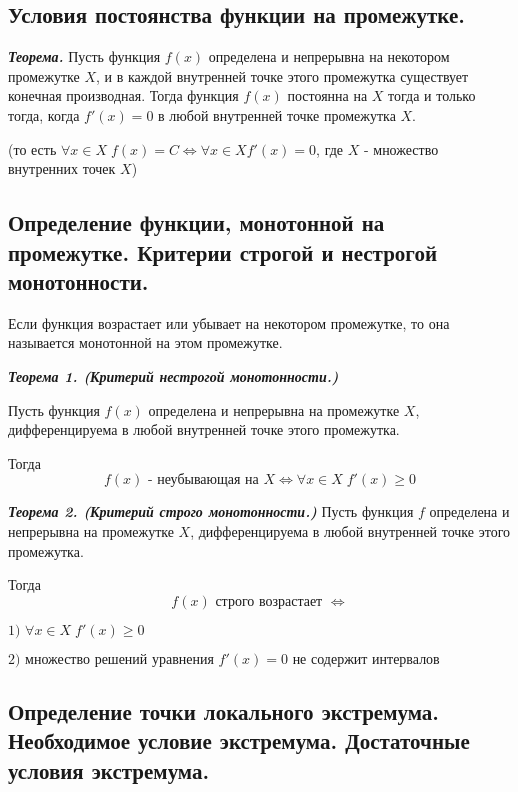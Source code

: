 \documentclass[a4paper,12pt]{article}
\theoremstyle{plain} %
\theoremstyle{definition} %
\theoremstyle{remark} %
\begin{document}
\newpage
{}
\subsection*{Условия постоянства функции на промежутке.                                                }

\textbf{\textit{Теорема.}} Пусть функция $f(x)$ определена и непрерывна на некотором промежутке $X$, и в каждой внутренней точке этого промежутка существует конечная производная. Тогда функция $f(x)$ постоянна на $X$ тогда и только тогда, когда $f'(x) = 0$ в любой внутренней точке промежутка $X$.

(то есть $\forall x \in X \; f(x) = C \Leftrightarrow \forall x \in X f'(x) = 0$, где $X$ - множество внутренних точек $X$)


\newpage
{}
\subsection*{Определение функции, монотонной на промежутке. Критерии строгой и нестрогой монотонности. }

Если функция возрастает или убывает на некотором промежутке, то она называется монотонной на этом промежутке.

\textit{\textbf{Теорема 1. (Критерий нестрогой монотонности.)}}

Пусть функция $f(x)$ определена и непрерывна на промежутке $X$, дифференцируема в любой внутренней точке этого промежутка.

Тогда
\[ f(x) \text{ - неубывающая на }X \Leftrightarrow \forall x \in X \; f'(x) \geq 0 \]

\textit{\textbf{Теорема 2. (Критерий строго монотонности.)}}
Пусть функция $f$ определена и непрерывна на промежутке $X$, дифференцируема в любой внутренней точке этого промежутка.

Тогда
\[
	f(x) \text{ строго возрастает } \Leftrightarrow \]

$\text{1) } \forall x \in X \; f'(x) \geq 0  $

$\text{2) множество решений уравнения } f'(x) = 0 \text{ не содержит интервалов} $


\newpage
{}
\subsection*{Определение точки локального экстремума. Необходимое условие экстремума. Достаточные условия экстремума. }
\end{document}
